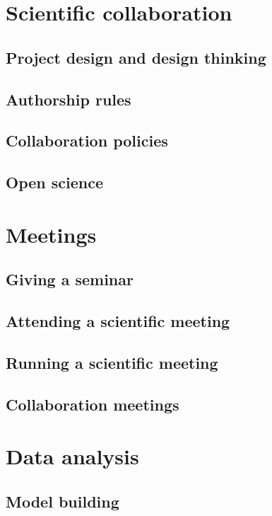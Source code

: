 \documentclass[12pt,letterpaper]{book}
\begin{document}
\part{Scientific collaboration}

\chapter{Project design and design thinking}

\chapter{Authorship rules}

\chapter{Collaboration policies}

\chapter{Open science}

\part{Meetings}

\chapter{Giving a seminar}

\chapter{Attending a scientific meeting}

\chapter{Running a scientific meeting}

\chapter{Collaboration meetings}

\part{Data analysis}

\chapter{Model building}
\end{document}
